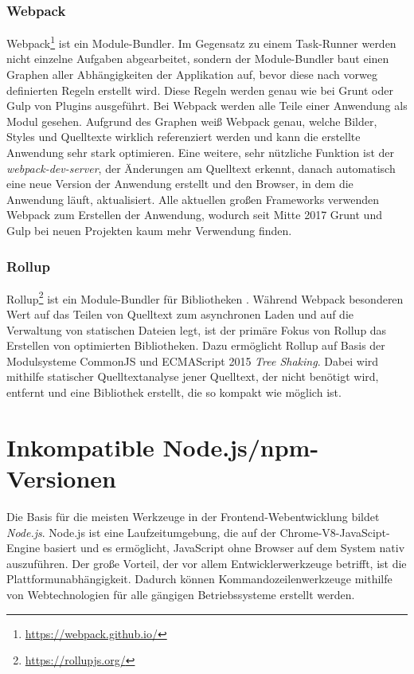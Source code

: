 \subsubsection{Webpack}
\label{sub:webpack}
Webpack\footnote{\url{https://webpack.github.io/}} ist ein Module-Bundler.
Im Gegensatz zu einem Task-Runner werden nicht einzelne Aufgaben abgearbeitet, sondern der Module-Bundler baut einen Graphen aller Abhängigkeiten der Applikation auf, bevor diese nach vorweg definierten Regeln erstellt wird.
Diese Regeln werden genau wie bei Grunt oder Gulp von Plugins ausgeführt.
Bei Webpack werden alle Teile einer Anwendung als Modul gesehen.
Aufgrund des Graphen weiß Webpack genau, welche Bilder, Styles und Quelltexte wirklich referenziert werden und kann die erstellte Anwendung sehr stark optimieren.
Eine weitere, sehr nützliche Funktion ist der \emph{webpack-dev-server}, der Änderungen am Quelltext erkennt, danach automatisch eine neue Version der Anwendung erstellt und den Browser, in dem die Anwendung läuft, aktualisiert.
Alle aktuellen großen Frameworks verwenden Webpack zum Erstellen der Anwendung, wodurch seit Mitte 2017 Grunt und Gulp bei neuen Projekten kaum mehr Verwendung finden.

\subsubsection{Rollup}
\label{sub:rollup}
Rollup\footnote{\url{https://rollupjs.org/}} ist ein Module-Bundler für Bibliotheken \autocite{Harris.webpack-vs-rollup:online}.
Während Webpack besonderen Wert auf das Teilen von Quelltext zum asynchronen Laden und auf die Verwaltung von statischen Dateien legt, ist der primäre Fokus von Rollup das Erstellen von optimierten Bibliotheken.
Dazu ermöglicht Rollup auf Basis der Modulsysteme CommonJS und ECMAScript 2015 \emph{Tree Shaking}.
Dabei wird mithilfe statischer Quelltextanalyse jener Quelltext, der nicht benötigt wird, entfernt und eine Bibliothek erstellt, die so kompakt wie möglich ist.


\section{Inkompatible Node.js/npm-Versionen}
Die Basis für die meisten Werkzeuge in der Frontend-Webentwicklung bildet \emph{Node.js}.
Node.js ist eine Laufzeitumgebung, die auf der Chrome-V8-JavaScipt-Engine basiert und es ermöglicht, JavaScript ohne Browser auf dem System nativ auszuführen.
Der große Vorteil, der vor allem Entwicklerwerkzeuge betrifft, ist die Plattformunabhängigkeit.
Dadurch können Kommandozeilenwerkzeuge mithilfe von Webtechnologien für alle gängigen Betriebssysteme erstellt werden.

